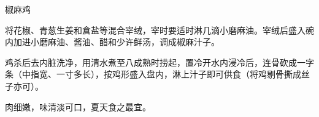 \begin{recipe}{椒麻鸡}

\ingredients




\cooking

将花椒、青葱生姜和倉盐等混合宰绒，宰时要适时淋几滴小磨麻油。宰绒后盛入碗内加进小磨麻油、酱油、醋和少许鲜汤，调成椒麻汁子。

鸡杀后去内脏洗净，用清水煮至八成熟时捞起，置冷开水内浸冷后，连骨砍成一字条（中指宽、一寸多长），按鸡形盛入盘内，淋上汁子即可供食（将鸡剔骨撕成丝子亦可）。

\notes

肉细嫩，味清淡可口，夏天食之最宜。

\end{recipe}

